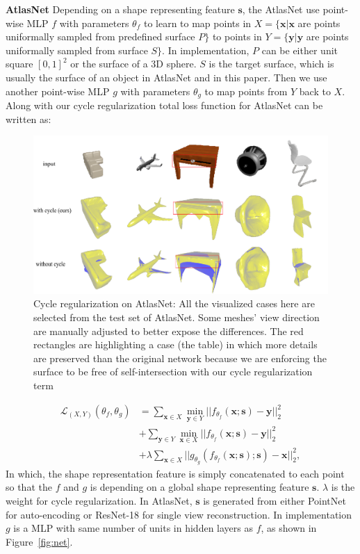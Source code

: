 \noindent\textbf{AtlasNet} Depending on a shape representing feature $\mathbf{s}$, the AtlasNet use point-wise MLP
$f$ with parameters $\theta_f$ to learn to map points in $X=\{\mathbf{x}| \mathbf{x}$ are points uniformally sampled from predefined surface $P\}$ to points in $Y=\{\mathbf{y}| \mathbf{y}$ are points uniformally sampled from surface $S\}$. In implementation, $P$ can be either unit square $[0,1]^2$ or the surface of a 3D sphere. $S$ is the target surface, which is usually the surface of an object in AtlasNet\cite{atlasnet} and in this paper. Then we use another point-wise MLP $g$ with parameters $\theta_g$ to map points from $Y$ back to $X$. Along with our cycle regularization  total loss function for AtlasNet can be written as:

\begin{figure}[htbp]
	\centering
	\includegraphics[width=\linewidth]{img/atlas/svr}
	\caption{Cycle regularization on AtlasNet: All the visualized cases here are selected from the test set of AtlasNet. Some meshes' view direction are manually adjusted to better expose the differences. The red rectangles are highlighting a case (the table) in which more details are preserved than the original network because we are enforcing the surface to be free of self-intersection with our cycle regularization term}
	\label{fig:svr}
\end{figure}

\begin{equation}
\begin{aligned}
\label{equ:atlascycle}
\mathcal{L}_{(X,Y)}(\theta_f,\theta_g) &= \sum_{\mathbf{x} \in X} \min_{\mathbf{y} \in Y}|| f_{\theta_f}(\mathbf{x};\mathbf{s}) - \mathbf{y} ||_2^2 \\ &+ \sum_{ \mathbf{y} \in Y}\min_{ \mathbf{x} \in X} || f_{\theta_f}(\mathbf{x};\mathbf{s}) - \mathbf{y} ||_2^2 \\ &+ \lambda\sum_{\mathbf{x} \in X}||g_{\theta_g}(f_{\theta_f}(\mathbf{x};\mathbf{s});\mathbf{s}) - \mathbf{x}||_2^2,
\end{aligned}
 \end{equation}
In which, the shape representation feature is simply concatenated to each point so that the $f$ and $g$ is depending on a global shape representing feature $\mathbf{s}$. $\lambda$ is the weight for cycle regularization. In AtlasNet, $\mathbf{s}$ is generated from either PointNet\cite{resnet} for auto-encoding or ResNet-18\cite{resnet} for single view reconstruction. In implementation $g$ is a MLP with same number of units in hidden layers as $f$, as shown in Figure~\ref{fig:net}.

